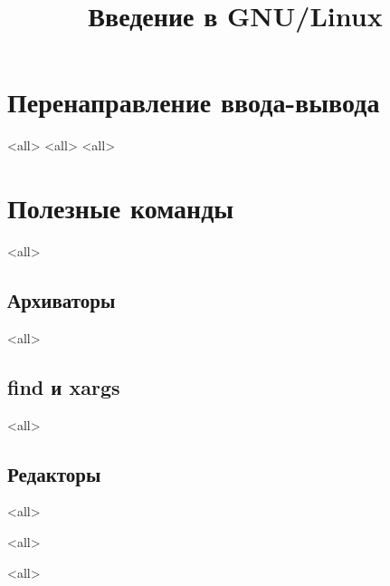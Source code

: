

\title{Введение в GNU/Linux}








\begin{frame}
	\frametitle{}
	\titlepage
	\vspace{-0.5cm}
	\begin{center}
	\end{center}
\end{frame}



\section{Перенаправление ввода-вывода}
\mode<all>{}
\mode<all>{}
\mode<all>{}

\section{Полезные команды}

\mode<all>{}

\subsection{Архиваторы}
\mode<all>{}

\subsection{find и xargs}
\mode<all>{}

\subsection{Редакторы}
\mode<all>{}

\mode<all>{}

\mode<all>

